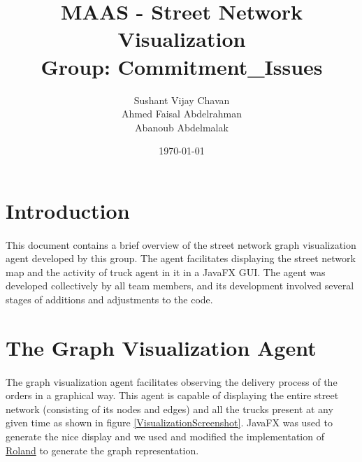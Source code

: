 \documentclass[11pt, a4paper]{article}
\title{MAAS - Street Network Visualization \\Group: Commitment\_Issues}
\author{Sushant Vijay Chavan\\Ahmed Faisal Abdelrahman\\Abanoub Abdelmalak}
\date{\today}
\begin{document}
\maketitle
\newpage
\tableofcontents{}
\newpage

\section{Introduction}
\paragraph{}
This document contains a brief overview of the street network graph visualization agent developed by this group. The agent facilitates displaying the street network map and the activity of truck agent in it in a JavaFX GUI. The agent was developed collectively by all team members, and its development involved several stages of additions and adjustments to the code.

\section{The Graph Visualization Agent}\label{GraphVisualizationAgent}
\paragraph{}
The graph visualization agent facilitates observing the delivery process of the orders in a graphical way. This agent is capable of displaying the entire street network (consisting of its nodes and edges) and all the trucks present at any given time as shown in figure \ref{VisualizationScreenshot}. JavaFX was used to generate the nice display and we used and modified the implementation of \href{https://stackoverflow.com/a/30696075}{Roland} to generate the graph representation.
\end{document}
